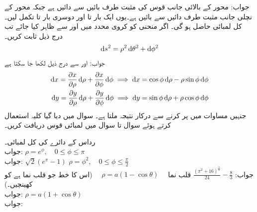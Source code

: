جواب: محور کے بالائی جانب قوس کی مثبت طرف بائیں سے دائیں ہے جبکہ محور کے نچلی جانب مثبت طرف دائیں سے بائیں ہے۔یوں ایک بار  تا  اور دوسری بار  تا  تکمل لیں۔ کل لمبائی  حاصل ہو گی۔
\quad اگر منحنی کو کروی محدد میں  اور  سے ظاہر کیا جائے تب درج ذیل ثابت کریں۔
\begin{align*}
\dif s^2=\rho^2\dif \theta^2+\dif \phi^2
\end{align*}
جواب: اور  سے درج ذیل لکھا جا سکتا ہے
\begin{align*}
\dif x=\frac{\partial x}{\partial \rho}\dif \rho+\frac{\partial x}{\partial \phi}\dif \phi  \implies \dif x=\cos \phi \dif \rho-\rho\sin \phi\dif \phi\\
\dif y=\frac{\partial y}{\partial \rho}\dif \rho+\frac{\partial y}{\partial \phi}\dif \phi\implies \dif y=\sin \phi \dif \rho+\rho\cos \phi \dif \phi 
\end{align*}
جنہیں مساوات  میں پر کرنے سے درکار نتیجہ ملتا ہے۔
سوال  میں دیا گیا کلیہ استعمال کرتے ہوئے سوال  تا سوال  میں لمبائی قوس دریافت کریں۔

\quad رداس  کے دائرے کی کل لمبائی۔\\
جواب:
\quad
$\rho=e^{\phi},\quad 0\le \phi \le \pi$\\
جواب:
$\sqrt{2}(e^{\pi}-1)$
\quad
$\rho=\phi^2,\quad 0\le \phi \le \tfrac{\pi}{2}$\\
جواب:
$\tfrac{(\pi^2+16)^{\tfrac{3}{2}}}{24}-\tfrac{8}{3}$
\quad قلب نما 
$\quad \rho=a(1-\cos \theta)\quad $
(اس کا خط جو قلب نما ہے کو کھینچیں۔)\\
جواب:
\quad
$\rho=a(1+\cos \theta)$\\
جواب:


